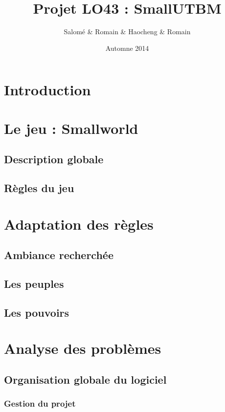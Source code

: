 \documentclass[11pt]{report}
\title{ Projet LO43 : SmallUTBM}
\author{Salomé \bsc{Welche} \& Romain \bsc{Dulieu} \& Haocheng \bsc{Xu} \& Romain \bsc{Thibaud}}
\date{Automne 2014}
\begin{document}
	\maketitle{}

	\tableofcontents

	\chapter{Introduction}

	\chapter{Le jeu : Smallworld}

		\section{Description globale}

		\section{Règles du jeu}

	\chapter{Adaptation des règles}

		\section{Ambiance recherchée}

		\section{Les peuples}

		\section{Les pouvoirs}

	\chapter{Analyse des problèmes}

		\section{Organisation globale du logiciel}

			\subsection{Gestion du projet}
\end{document}
